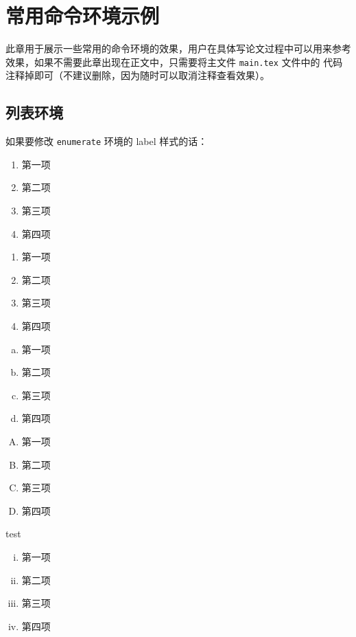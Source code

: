 \chapter{常用命令环境示例}

此章用于展示一些常用的命令环境的效果，用户在具体写论文过程中可以用来参考效果，如果不需要此章出现在正文中，只需要将主文件 \verb|main.tex| 文件中的 \verb|| 代码注释掉即可（不建议删除，因为随时可以取消注释查看效果）。


\section{列表环境}


如果要修改 \verb|enumerate| 环境的 label 样式的话：

\begin{enumerate}
  \item 第一项
  \item 第二项
  \item 第三项
  \item 第四项
\end{enumerate}

\begin{enumerate}[1)]
  \item 第一项
  \item 第二项
  \item 第三项
  \item 第四项
\end{enumerate}

\begin{enumerate}[a.]
  \item 第一项
  \item 第二项
  \item 第三项
  \item 第四项
\end{enumerate}

\begin{enumerate}[(A)]
  \item 第一项
  \item 第二项
  \item 第三项
  \item 第四项
\end{enumerate}

test
\begin{enumerate}[(i)]
  \item 第一项
  \item 第二项
  \item 第三项
  \item 第四项
\end{enumerate}

